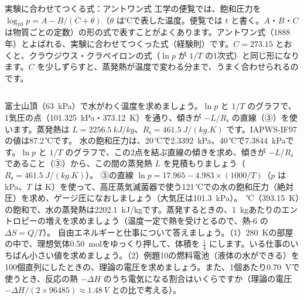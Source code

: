 \begin{column}{実験に合わせてつくる式：アントワン式}
工学の便覧では、飽和圧力を $\log_{10}p=A-B/(C+\theta)$（$\theta$ は℃で表した温度。便覧では $t$ と書く。$A$・$B$・$C$ は物質ごとの定数）の形の式で表すことがよくあります。アントワン式（1888年）とよばれる、実験に合わせてつくった式（経験則）です。$C=273.15$ とおくと、クラウジウス・クラペイロンの式（$\ln p$ が $1/T$ の1次式）と同じ形になります。$C$ を少しずらすと、蒸発熱が温度で変わる分まで、うまく合わせられるのです。
\end{column}

\bkendproblems
{}
\bkproblem 富士山頂（\qty{63}{kPa}）で水がわく温度を求めましょう。$\ln p$ と $1/T$ のグラフで、1気圧の点（\qty{101.325}{kPa}・\qty{373.12}{K}）を通り、傾きが $-L/R_{\mathrm s}$ の直線（③）を使います。蒸発熱は $L=\qty{2256.5}{kJ/kg}$、$R_{\mathrm s}=\qty{461.5}{J/(kg.K)}$ です。IAPWS-IF97 の値は87.2\,℃です。
\bkproblem 水の飽和圧力は、20\,℃で\qty{2.3392}{kPa}、40\,℃で\qty{7.3844}{kPa}です。$\ln p$ と $1/T$ のグラフで、この2点を結ぶ直線の傾きを求め、傾きが $-L/R_{\mathrm s}$ であること（③）から、この間の蒸発熱 $L$ を見積もりましょう（$R_{\mathrm s}=\qty{461.5}{J/(kg.K)}$）。
\bkproblem ③の直線 $\ln p=17.965-4.983\times(1000/T)$（$p$ は kPa、$T$ は K）を使って、高圧蒸気滅菌器で使う121\,℃での水の飽和圧力（絶対圧）を求め、ゲージ圧になおしましょう（大気圧は\qty{101.3}{kPa}）。
\,℃（\qty{393.15}{K}）の飽和で、水の蒸発熱は\qty{2202.1}{kJ/kg}です。蒸発するときの、\qty{1}{kg}あたりのエントロピーの増えを求めましょう（温度一定で熱を受けとるので、熱-6 の $\Delta S=Q/T$）。
\bkproblem 自由エネルギーと仕事について答えましょう。（1）\qty{280}{K}の部屋の中で、理想気体\qty{0.50}{mol}をゆっくり押して、体積を $\tfrac14$ にします。いる仕事のいちばん小さい値を求めましょう。（2）例題10の燃料電池（液体の水ができる）を100個直列にしたときの、理論の電圧を求めましょう。また、1個あたり\qty{0.70}{V}で使うとき、反応の熱 $-\Delta H$ のうち電気になる割合はいくらですか（理論の電圧 $-\Delta H/(2\times96485)\approx\qty{1.48}{V}$ との比で考える）。

